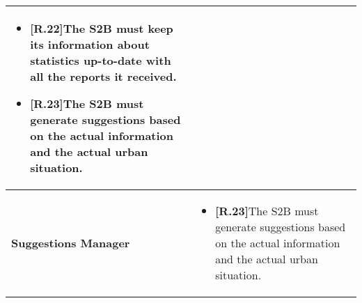 \begin{table}[H]
\begin{tabular}{|l|p{}|}
\begin{itemize}
    \item \textbf{[R.22]}The S2B must keep its information about statistics up-to-date with all the reports it received.
    
    \item \textbf{[R.23]}The S2B must generate suggestions based on the actual information and the actual urban situation.
    
\end{itemize} \\\hline


\textbf{Suggestions Manager}    &  \begin{itemize}
    \item \textbf{[R.23]}The S2B must generate suggestions based on the actual information and the actual urban situation.
\end{itemize} \\\hline



\end{tabular}
\end{table}

